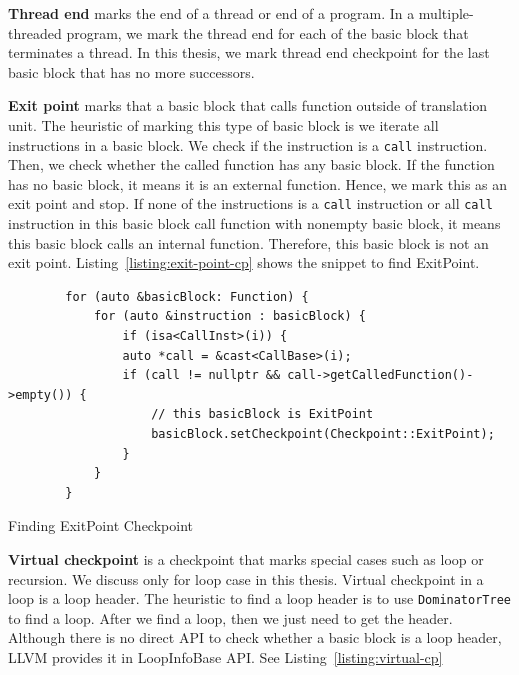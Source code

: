 \vspace{0.5cm}
\noindent \textbf{Thread end} marks the end of a thread or end of a program. In
a multiple-threaded program, we mark the thread end for each of the basic block
that terminates a thread. In this thesis, we mark thread end checkpoint for the
last basic block that has no more successors.

\vspace{0.5cm}
\noindent \textbf{Exit point} marks that a basic block that calls function
outside of translation unit. The heuristic of marking this type of basic block
is we iterate all instructions in a basic block. We check if the instruction is
a \texttt{call} instruction. Then, we check whether the called function has any
basic block. If the function has no basic block, it means it is an external
function. Hence, we mark this as an exit point and stop. If none of the
instructions is a \texttt{call} instruction or all \texttt{call} instruction in
this basic block call function with nonempty basic block, it means this basic
block calls an internal function. Therefore, this basic block is not an exit
point. Listing~\ref{listing:exit-point-cp} shows the snippet to find ExitPoint.

\begin{listing}[htbp]
    \begin{verbatim}
        for (auto &basicBlock: Function) {
            for (auto &instruction : basicBlock) {
                if (isa<CallInst>(i)) {
                auto *call = &cast<CallBase>(i);
                if (call != nullptr && call->getCalledFunction()->empty()) {
                    // this basicBlock is ExitPoint
                    basicBlock.setCheckpoint(Checkpoint::ExitPoint);
                } 
            }
        } 
    \end{verbatim}
    \caption{Finding ExitPoint Checkpoint}    
    \label{listing:exit-point-cp}
\end{listing}

\vspace{0.5cm}
\noindent \textbf{Virtual checkpoint} is a checkpoint that marks special cases
such as loop or recursion. We discuss only for loop case in this thesis.
Virtual checkpoint in a loop is a loop header. The heuristic to find a loop
header is to use \texttt{DominatorTree} to find a loop. After we find a loop,
then we just need to get the header. Although there is no direct API to check
whether a basic block is a loop header, LLVM provides it in LoopInfoBase API.
See Listing~\ref{listing:virtual-cp}

